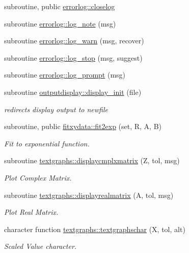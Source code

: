 \begin{DoxyCompactItemize}
\item 
subroutine, public \hyperlink{namespaceerrorlog_af9219c790b58905faca7f5695515325d}{errorlog\+::closelog}
\item 
subroutine \hyperlink{namespaceerrorlog_abcaf87ab55e0634007cc7177aa53469c}{errorlog\+::log\+\_\+note} (msg)
\item 
subroutine \hyperlink{namespaceerrorlog_ac0a3d2c2bcdb3af8e91b4a27d2ac5ac0}{errorlog\+::log\+\_\+warn} (msg, recover)
\item 
subroutine \hyperlink{namespaceerrorlog_afe1872ea4ca114ccb25faaa2f2d60e2e}{errorlog\+::log\+\_\+stop} (msg, suggest)
\item 
subroutine \hyperlink{namespaceerrorlog_ac6531d63b5a5d4939c3d510dd7fbbb25}{errorlog\+::log\+\_\+prompt} (msg)
\item 
subroutine \hyperlink{namespaceoutputdisplay_a9a8a15080a89f2947af09f8fb326a2e0}{outputdisplay\+::display\+\_\+init} (file)
\begin{DoxyCompactList}\small\item\em redirects display output to newfile \end{DoxyCompactList}\item 
subroutine, public \hyperlink{namespacefitxydata_a9f00dca017c2372da0c3c95cdf0ddb31}{fitxydata\+::fit2exp} (set, R, A, B)
\begin{DoxyCompactList}\small\item\em Fit to exponential function. \end{DoxyCompactList}\item 
subroutine \hyperlink{namespacetextgraphs_a34e0dbcefa5d7f20393912bea281116e}{textgraphs\+::displaycmplxmatrix} (Z, tol, msg)
\begin{DoxyCompactList}\small\item\em Plot Complex Matrix. \end{DoxyCompactList}\item 
subroutine \hyperlink{namespacetextgraphs_aec95adcc32b77f95f0a3625ca97cc374}{textgraphs\+::displayrealmatrix} (A, tol, msg)
\begin{DoxyCompactList}\small\item\em Plot Real Matrix. \end{DoxyCompactList}\item 
character function \hyperlink{namespacetextgraphs_accad584018d6cbbc199cc77b34ef2db5}{textgraphs\+::textgraphschar} (X, tol, alt)
\begin{DoxyCompactList}\small\item\em Scaled Value character. \end{DoxyCompactList}\item 

\end{DoxyCompactItemize}
